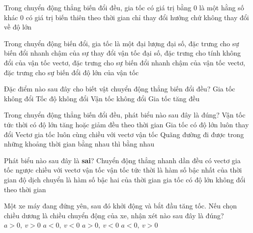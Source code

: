 \begin{ex}%
Trong chuyển động thẳng biến đổi đều, gia tốc
\choice
{có giá trị bằng $0$}
{\True là một hằng số khác $0$}
{có giá trị biến thiên theo thời gian}
{chỉ thay đổi hướng chứ không thay đổi về độ lớn}
\loigiai{

}
\end{ex}
\begin{ex}%
Trong chuyển động biến đổi, gia tốc là một đại lượng
\choice
{đại số, đặc trưng cho sự biến đổi nhanh chậm của sự thay đổi vận tốc}
{đại số, đặc trưng cho tính không đổi của vận tốc}
{\True vectơ, đặc trưng cho sự biến đổi nhanh chậm của vận tốc}
{vectơ, đặc trưng cho sự biến đổi độ lớn của vận tốc}

\loigiai{
}
 \end{ex}
\begin{ex}%
Đặc điểm nào sau đây cho biết vật chuyển động thẳng biến đổi đều?
\choice
{\True Gia tốc không đổi}
{Tốc độ không đổi}
{Vận tốc không đổi}
{Gia tốc tăng đều}

\loigiai{
}
 \end{ex}
\begin{ex}%
Trong chuyển động thẳng biến đổi đều, phát biểu nào sau đây là đúng?
\choice
{\True Vận tốc tức thời có độ lớn tăng hoặc giảm đều theo thời gian}
{Gia tốc có độ lớn luôn thay đổi}
{Vectơ gia tốc luôn cùng chiều với vectơ vận tốc}
{Quãng đường đi được trong những khoảng thời gian bằng nhau thì bằng nhau}

\loigiai{
}
 \end{ex}
\begin{ex}%
Phát biểu nào sau đây là  \textbf{sai}? Chuyển động thẳng nhanh dần đều có
\choice
{\True vectơ gia tốc ngược chiều với vectơ vận tốc}
{vận tốc tức thời là hàm số bậc nhất của thời gian}
{độ dịch chuyển là hàm số bậc hai của thời gian}
{gia tốc có độ lớn không đổi theo thời gian}	
\loigiai{
}
\end{ex}
\begin{ex}%
Một xe máy đang đứng yên, sau đó khởi động và bắt đầu tăng tốc. Nếu chọn chiều dương là chiều chuyển động của xe, nhận xét nào sau đây là đúng?
\choice
{\True $a>0,\ v>0$}
{$a<0,\ v<0$}
{$a>0,\ v<0$}
{$a<0,\ v>0$}
\loigiai{
}
 \end{ex}
